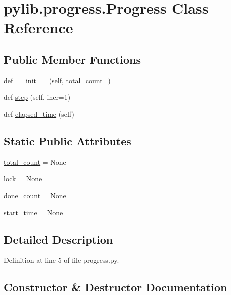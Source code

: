 \hypertarget{classpylib_1_1progress_1_1Progress}{}\section{pylib.\+progress.\+Progress Class Reference}
\label{classpylib_1_1progress_1_1Progress}
\subsection*{Public Member Functions}
\begin{DoxyCompactItemize}
\item 
def \hyperlink{classpylib_1_1progress_1_1Progress_a8cf7bc16833e35c0e232fc3dbe77d4ff}{\+\_\+\+\_\+init\+\_\+\+\_\+} (self, total\+\_\+count\+\_\+)
\item 
def \hyperlink{classpylib_1_1progress_1_1Progress_ae53e3c29d3bb93129245074cb2421351}{step} (self, incr=1)
\item 
def \hyperlink{classpylib_1_1progress_1_1Progress_a14752024d7d99df8c81fa5e605e8f0c4}{elapsed\+\_\+time} (self)
\end{DoxyCompactItemize}
\subsection*{Static Public Attributes}
\begin{DoxyCompactItemize}
\item 
\hyperlink{classpylib_1_1progress_1_1Progress_a52f5b22b6865612099802e716c147120}{total\+\_\+count} = None
\item 
\hyperlink{classpylib_1_1progress_1_1Progress_ac246085b3c5409b2827c60827d394cb2}{lock} = None
\item 
\hyperlink{classpylib_1_1progress_1_1Progress_ac07d6b8453fb0aa744750c052e872fbf}{done\+\_\+count} = None
\item 
\hyperlink{classpylib_1_1progress_1_1Progress_a68f98a1bb08bc59fa8d3b8382e5dde53}{start\+\_\+time} = None
\end{DoxyCompactItemize}


\subsection{Detailed Description}


Definition at line 5 of file progress.\+py.



\subsection{Constructor \& Destructor Documentation}
